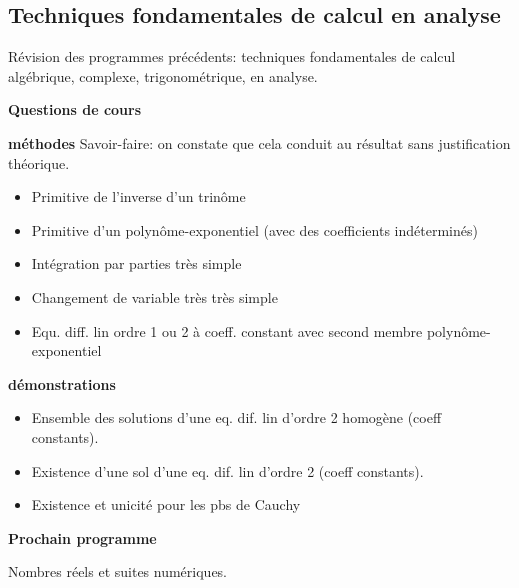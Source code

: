 





\subsection{Techniques fondamentales de calcul en analyse}



Révision des programmes précédents: techniques fondamentales de calcul algébrique, complexe, trigonométrique, en analyse.

\bigskip
\begin{center}
 \textbf{Questions de cours}
\end{center}
\textbf{méthodes}\newline
Savoir-faire: on constate que cela conduit au résultat sans justification théorique. 
\begin{itemize}
 \item Primitive de l'inverse d'un trinôme
 \item Primitive d'un polynôme-exponentiel (avec des coefficients indéterminés)
 \item Intégration par parties très simple
 \item Changement de variable très très simple
 \item Equ. diff. lin ordre 1 ou 2 à coeff. constant avec second membre polynôme-exponentiel
\end{itemize}

\textbf{démonstrations}
\begin{itemize}
 \item Ensemble des solutions d'une eq. dif. lin d'ordre 2 homogène (coeff constants).
 \item Existence d'une sol d'une eq. dif. lin d'ordre 2 (coeff constants).
 \item Existence et unicité pour les pbs de Cauchy 
\end{itemize}


\begin{center}
 \textbf{Prochain programme}
\end{center}
Nombres réels et suites numériques.


